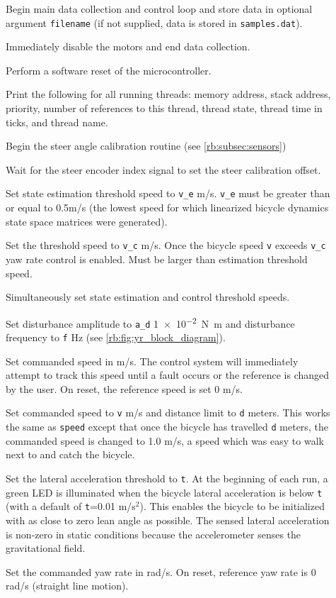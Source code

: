 \begin{description}
  \item[] Begin main data collection and control loop and store
    data in optional argument \verb|filename| (if not supplied, data is stored in
    \verb|samples.dat|).
  \item[] Immediately disable the motors and end data collection.
  \item[] Perform a software reset of the microcontroller.
  \item[] Print the following for all running threads: memory
    address, stack address, priority, number of references to this thread,
    thread state, thread time in ticks, and thread name.
  \item[] Begin the steer angle calibration routine (see
    \autoref{rb:subsec:sensors})
  \item[] Wait for the steer encoder index signal to set the steer calibration offset.
  \item[] Set state estimation threshold speed to \verb|v_e| m/s.
    \verb|v_e| must be greater than or equal to 0.5m/s (the lowest speed
    for which linearized bicycle dynamics state space matrices were generated).
  \item[] Set the threshold speed to \verb|v_c| m/s. Once the
    bicycle speed \verb|v| exceeds \verb|v_c| yaw rate control is enabled. Must
    be larger than estimation threshold speed.
  \item[] Simultaneously set state estimation and control threshold speeds.
  \item[] Set disturbance amplitude to
    \verb|a_d| \SI{1e-2}{\N\m}
    and disturbance frequency to \verb|f| \si{\Hz} (see
    \autoref{rb:fig:yr_block_diagram}).
  \item[] Set commanded speed in m/s. The control system will
    immediately attempt to track this speed until a fault occurs or the
    reference is changed by the user. On reset, the reference speed is set 0
    m/s.
  \item[] Set commanded speed to \verb|v| m/s and distance
    limit to \verb|d| meters. This works the same as \verb|speed| except that
    once the bicycle has travelled \verb|d| meters, the commanded speed is
    changed to 1.0 m/s, a speed which was easy to walk next to and catch the
    bicycle.
  \item[] Set the lateral acceleration threshold to \verb|t|. At
    the beginning of each run, a green LED is illuminated when the bicycle
    lateral acceleration is below \verb|t| (with a default of \verb|t|=0.01
    m/s$^2$). This enables the bicycle to be initialized with as close to zero
    lean angle as possible. The sensed lateral acceleration is non-zero in
    static conditions because the accelerometer senses the gravitational field.
  \item[] Set the commanded yaw rate in rad/s. On
    reset, reference yaw rate is 0 rad/s (straight line motion).

\end{description}

